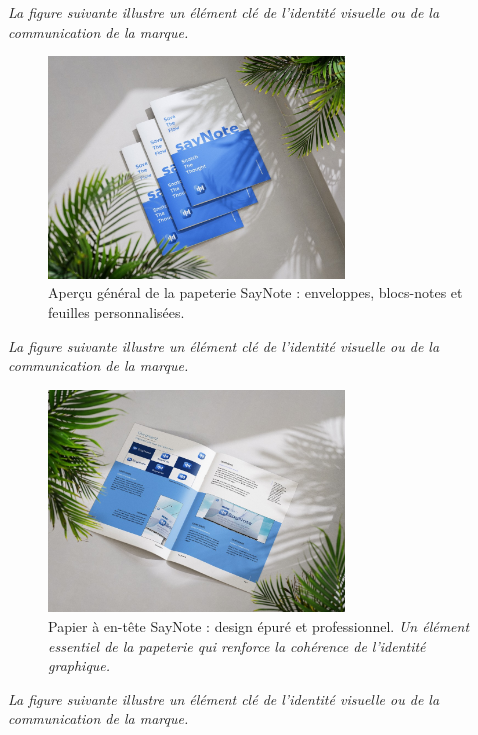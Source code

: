 \noindent
\textit{La figure suivante illustre un élément clé de l'identité visuelle ou de la communication de la marque.}
\begin{figure}[H]
    \centering
    \includegraphics[width=0.7\textwidth]{docs/visual-indentity/pictures/pappiers.jpg}
    \caption{Aperçu général de la papeterie SayNote : enveloppes, blocs-notes et feuilles personnalisées.}
\end{figure}
\noindent
\textit{La figure suivante illustre un élément clé de l'identité visuelle ou de la communication de la marque.}
\begin{figure}[H]
    \centering
    \includegraphics[width=0.7\textwidth]{docs/visual-indentity/pictures/pappier.jpg}
    \caption{Papier à en-tête SayNote : design épuré et professionnel. \newline\textit{Un élément essentiel de la papeterie qui renforce la cohérence de l'identité graphique.}}
\end{figure}
\noindent
\textit{La figure suivante illustre un élément clé de l'identité visuelle ou de la communication de la marque.}
